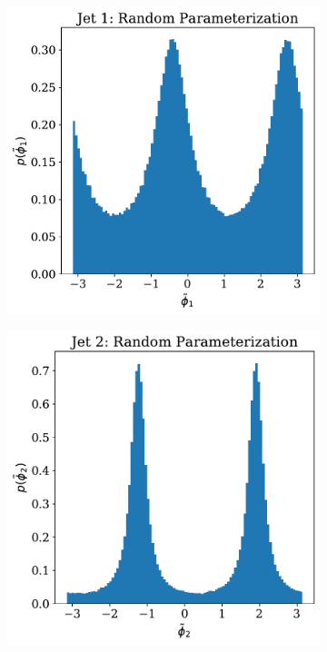 \begin{figure}
    \centering
    \begin{subfigure}[b]{0.45\textwidth}
        \centering
        \includegraphics[width=\textwidth]{figures/chapter-09/KL_rand1.pdf}
        \caption{}
        \label{fig:KLrand_i}
    \end{subfigure}
    \hfill
    \begin{subfigure}[b]{0.45\textwidth}
        \centering
        \includegraphics[width=\textwidth]{figures/chapter-09/KL_rand2.pdf}

\end{subfigure}
\end{figure}
